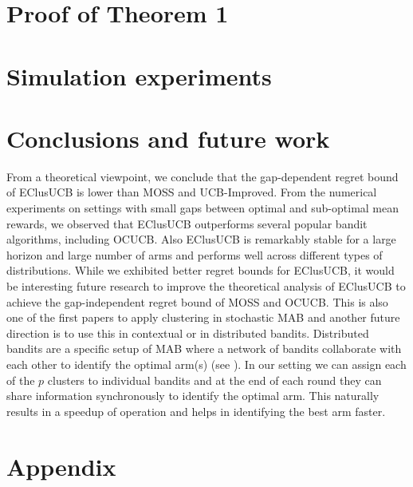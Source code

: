 \documentclass{article}
\begin{document}
\section{Proof of Theorem 1}
\label{sec:proofTheorem}
\vspace*{-0.7em}

%
\section{Simulation experiments}
\label{sec:expts}

%
\section{Conclusions and future work}
\label{sec:conclusions}
\vspace*{-0.7em}
From a theoretical viewpoint, we conclude that the gap-dependent regret bound of EClusUCB is lower than MOSS and UCB-Improved. From the numerical experiments on settings with small gaps between optimal and sub-optimal mean rewards, we observed that EClusUCB outperforms several popular bandit algorithms,  including OCUCB. Also EClusUCB is remarkably stable for a large horizon and large number of arms and performs well across different types of distributions. While we exhibited better regret bounds for EClusUCB, it would be interesting future research to improve the theoretical analysis of EClusUCB to achieve the gap-independent regret bound of MOSS and OCUCB. This is also one of the first papers to apply clustering in stochastic MAB and another future direction is to use this in contextual or in distributed bandits. Distributed bandits are a specific setup of MAB where a network of bandits collaborate with each other to identify the optimal arm(s) (see \citet{awerbuch2008competitive,liu2010distributed,szorenyi2013gossip,hillel2013distributed}). In our setting we can assign each of the $p$ clusters to individual bandits and at the end of each round they can share information synchronously to identify the optimal arm. This naturally results in a speedup of operation and helps in identifying the best arm faster. 


\clearpage
\newpage






\clearpage
\newpage
\onecolumn
\section*{Appendix}

\end{document}
